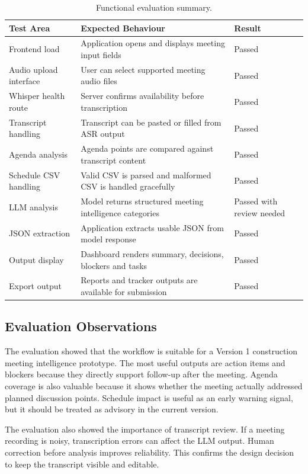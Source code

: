 \documentclass[11pt,a4paper]{article}
\begin{document}
\begin{table}[H]
\centering
\caption{Functional evaluation summary.}
\label{tab:functional}
\begin{tabularx}{\textwidth}{p{3.2cm}Y p{2.6cm}}
\toprule
\textbf{Test Area} & \textbf{Expected Behaviour} & \textbf{Result} \\
\midrule
Frontend load & Application opens and displays meeting input fields & Passed \\
Audio upload interface & User can select supported meeting audio files & Passed \\
Whisper health route & Server confirms availability before transcription & Passed \\
Transcript handling & Transcript can be pasted or filled from ASR output & Passed \\
Agenda analysis & Agenda points are compared against transcript content & Passed \\
Schedule CSV handling & Valid CSV is parsed and malformed CSV is handled gracefully & Passed \\
LLM analysis & Model returns structured meeting intelligence categories & Passed with review needed \\
JSON extraction & Application extracts usable JSON from model response & Passed \\
Output display & Dashboard renders summary, decisions, blockers and tasks & Passed \\
Export output & Reports and tracker outputs are available for submission & Passed \\
\bottomrule
\end{tabularx}
\end{table}

\subsection{Evaluation Observations}

The evaluation showed that the workflow is suitable for a Version 1 construction meeting intelligence prototype. The most useful outputs are action items and blockers because they directly support follow-up after the meeting. Agenda coverage is also valuable because it shows whether the meeting actually addressed planned discussion points. Schedule impact is useful as an early warning signal, but it should be treated as advisory in the current version.

The evaluation also showed the importance of transcript review. If a meeting recording is noisy, transcription errors can affect the LLM output. Human correction before analysis improves reliability. This confirms the design decision to keep the transcript visible and editable.
\end{document}
